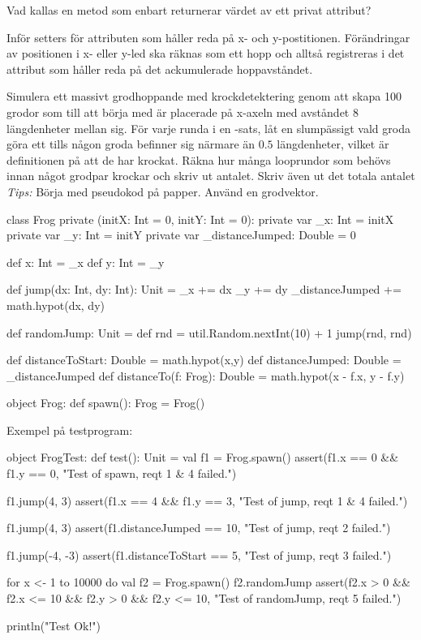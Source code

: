 \Subtask Vad kallas en metod som enbart returnerar värdet av ett privat attribut?

\Subtask Inför setters för attributen som håller reda på x- och y-postitionen. Förändringar av positionen i x- eller y-led ska räknas som ett hopp och alltså registreras i det attribut som håller reda på det ackumulerade hoppavståndet.

\Subtask Simulera ett massivt grodhoppande med krockdetektering genom att skapa 100 grodor som till att börja med är placerade på x-axeln med avståndet $8$ längdenheter mellan sig. För varje runda i en -sats, låt en slumpässigt vald groda göra ett  tills någon groda befinner sig närmare än $0.5$ längdenheter, vilket är definitionen på att de har krockat. Räkna hur många looprundor som behövs innan något grodpar krockar och skriv ut antalet. Skriv även ut det totala antalet \\ \emph{Tips:} Börja med pseudokod på papper. Använd en grodvektor.


\SOLUTION


\TaskSolved \what


\SubtaskSolved
\begin{Code}
class Frog private (initX: Int = 0, initY: Int = 0):
  private var _x: Int = initX
  private var _y: Int = initY
  private var _distanceJumped: Double = 0

  def x: Int = _x
  def y: Int = _y

  def jump(dx: Int, dy: Int): Unit =
    _x += dx
    _y += dy
    _distanceJumped += math.hypot(dx, dy)


  def randomJump: Unit =
    def rnd = util.Random.nextInt(10) + 1
    jump(rnd, rnd)

  def distanceToStart: Double = math.hypot(x,y)
  def distanceJumped: Double = _distanceJumped
  def distanceTo(f: Frog): Double = math.hypot(x - f.x, y - f.y)

object Frog:
  def spawn(): Frog = Frog()
\end{Code}

\SubtaskSolved Exempel på testprogram:
\begin{Code}
object FrogTest:
  def test(): Unit =
    val f1 = Frog.spawn()
    assert(f1.x == 0 && f1.y == 0, "Test of spawn, reqt 1 & 4 failed.")

    f1.jump(4, 3)
    assert(f1.x == 4 && f1.y == 3, "Test of jump, reqt 1 & 4 failed.")

    f1.jump(4, 3)
    assert(f1.distanceJumped == 10, "Test of jump, reqt 2 failed.")

    f1.jump(-4, -3)
    assert(f1.distanceToStart == 5, "Test of jump, reqt 3 failed.")

    for x <- 1 to 10000 do
      val f2 = Frog.spawn()
      f2.randomJump
      assert(f2.x > 0 && f2.x <= 10 && f2.y > 0 && f2.y <= 10,
        "Test of randomJump, reqt 5 failed.")

    println("Test Ok!")
\end{Code}

